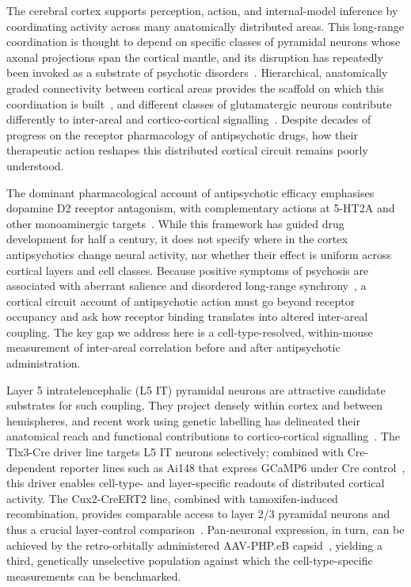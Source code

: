 \documentclass[11pt]{article}
\begin{document}
The cerebral cortex supports perception, action, and internal-model inference by coordinating activity across many anatomically distributed areas. This long-range coordination is thought to depend on specific classes of pyramidal neurons whose axonal projections span the cortical mantle, and its disruption has repeatedly been invoked as a substrate of psychotic disorders~\citep{uhlhaas2015oscillations, uhlhaas2013highfrequency, bahner2017hippocampal}. Hierarchical, anatomically graded connectivity between cortical areas provides the scaffold on which this coordination is built~\citep{harris2019hierarchical, siegle2021survey}, and different classes of glutamatergic neurons contribute differently to inter-areal and cortico-cortical signalling~\citep{matho2021genetic, biccn2021multimodal, liu2024celltype}. Despite decades of progress on the receptor pharmacology of antipsychotic drugs, how their therapeutic action reshapes this distributed cortical circuit remains poorly understood.

The dominant pharmacological account of antipsychotic efficacy emphasises dopamine D2 receptor antagonism, with complementary actions at 5-HT2A and other monoaminergic targets~\citep{howes2009dopamine, kambeitz2014alterations}. While this framework has guided drug development for half a century, it does not specify where in the cortex antipsychotics change neural activity, nor whether their effect is uniform across cortical layers and cell classes. Because positive symptoms of psychosis are associated with aberrant salience and disordered long-range synchrony~\citep{uhlhaas2015oscillations, bahner2017hippocampal}, a cortical circuit account of antipsychotic action must go beyond receptor occupancy and ask how receptor binding translates into altered inter-areal coupling. The key gap we address here is a cell-type-resolved, within-mouse measurement of inter-areal correlation before and after antipsychotic administration.

Layer 5 intratelencephalic (L5 IT) pyramidal neurons are attractive candidate substrates for such coupling. They project densely within cortex and between hemispheres, and recent work using genetic labelling has delineated their anatomical reach and functional contributions to cortico-cortical signalling~\citep{liu2024celltype, shinotsuka2023layer5, atudorei2024bilateral, matho2021genetic}. The Tlx3-Cre driver line targets L5 IT neurons selectively; combined with Cre-dependent reporter lines such as Ai148 that express GCaMP6 under Cre control~\citep{daigle2018suite, chen2013ultrasensitive}, this driver enables cell-type- and layer-specific readouts of distributed cortical activity. The Cux2-CreERT2 line, combined with tamoxifen-induced recombination, provides comparable access to layer 2/3 pyramidal neurons and thus a crucial layer-control comparison~\citep{daigle2018suite}. Pan-neuronal expression, in turn, can be achieved by the retro-orbitally administered AAV-PHP.eB capsid~\citep{chan2017engineered}, yielding a third, genetically unselective population against which the cell-type-specific measurements can be benchmarked.
\end{document}
